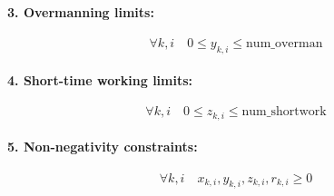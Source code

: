 \documentclass{article}
\begin{document}
\paragraph{3. Overmanning limits:}
\begin{equation}
\forall k, i \quad 0 \leq y_{k,i} \leq \text{num\_overman}
\end{equation}

\paragraph{4. Short-time working limits:}
\begin{equation}
\forall k, i \quad 0 \leq z_{k,i} \leq \text{num\_shortwork}
\end{equation}

\paragraph{5. Non-negativity constraints:}
\begin{equation}
\forall k, i \quad x_{k,i}, y_{k,i}, z_{k,i}, r_{k,i} \geq 0
\end{equation}
\end{document}
